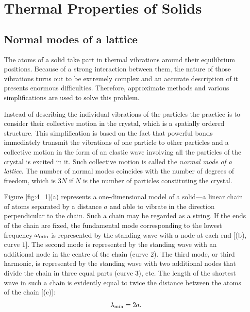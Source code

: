 

\chapter[Thermal Properties of Solids]{Thermal Properties of Solids}\label{chap:4}

\section{Normal modes of a lattice}\label{sec:30}

The atoms of a solid take part in thermal vibrations around their equilibrium positions. Because of a strong interaction between them, the nature of those vibrations turns out to be extremely complex and an accurate description of it presents enormous difficulties. Therefore, approximate methods and various simplifications are used to solve this problem.

Instead of describing the individual vibrations of the particles the practice is to consider their collective motion in the crystal, which is a spatially ordered structure. This simplification is based on the fact that powerful bonds immediately transmit the vibrations of one particle to other particles and a collective motion in the form of an elastic wave involving all the particles of the crystal is excited in it. Such collective motion is called the \textit{normal mode of a lattice}. The number of normal modes coincides with the number of degrees of freedom, which is $3N$ if $N$ is the number of particles constituting the crystal.

Figure \ref{fig:4_1}(a) represents a one-dimensional model of a solid---a linear chain of atoms separated by a distance $a$ and able to vibrate in the direction perpendicular to the chain. Such a chain may be regarded as a string. If the ends of the chain are fixed, the fundamental mode corresponding to the lowest frequency $\omega_{\text{min}}$ is represented by the standing wave with a node at each end [(b), curve $1$]. The second mode is represented by the standing wave with an additional node in the centre of the chain (curve $2$). The third mode, or third harmonic, is represented by the standing wave with two additional nodes that divide the chain in three equal parts (curve $3$), etc. The length of the shortest wave in such a chain is evidently equal to twice the distance between the atoms of the chain [(c)]:
\begin{equation}\label{eq:4_1}
    \lambda_{\text{min}} = 2 a.
\end{equation}

